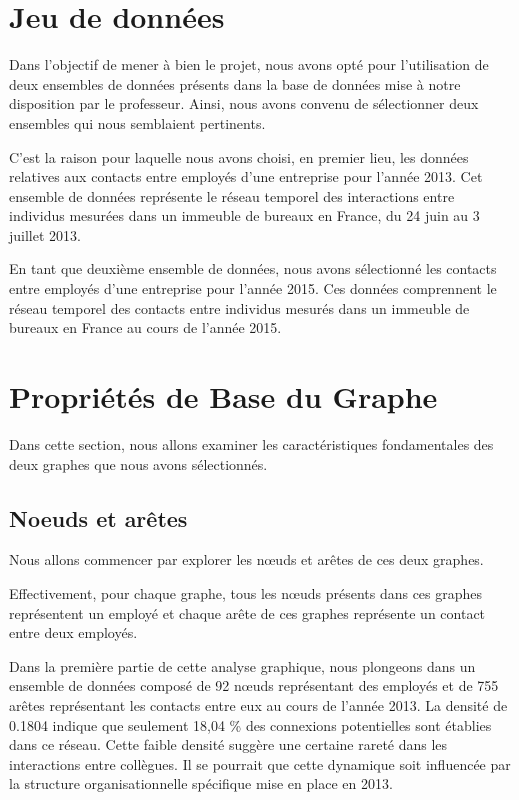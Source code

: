 \documentclass{article}
\begin{document}
\section{Jeu de données}
Dans l'objectif de mener à bien le projet, nous avons opté pour l'utilisation de deux ensembles de données présents dans la base de données mise à notre disposition par le professeur. Ainsi, nous avons convenu de sélectionner deux ensembles qui nous semblaient pertinents.

C'est la raison pour laquelle nous avons choisi, en premier lieu, les données relatives aux contacts entre employés d'une entreprise pour l'année 2013. Cet ensemble de données représente le réseau temporel des interactions entre individus mesurées dans un immeuble de bureaux en France, du 24 juin au 3 juillet 2013.

En tant que deuxième ensemble de données, nous avons sélectionné les contacts entre employés d'une entreprise pour l'année 2015. Ces données comprennent le réseau temporel des contacts entre individus mesurés dans un immeuble de bureaux en France au cours de l'année 2015.

\section{Propriétés de Base du Graphe}

Dans cette section, nous allons examiner les caractéristiques fondamentales des deux graphes que nous avons sélectionnés.


\subsection{Noeuds et arêtes}
Nous allons commencer par explorer les nœuds et arêtes de ces deux graphes.

Effectivement, pour chaque graphe, tous les nœuds présents dans ces graphes représentent un employé et chaque arête de ces graphes représente un contact entre deux employés.


Dans la première partie de cette analyse graphique, nous plongeons dans un ensemble de données composé de 92 nœuds représentant des employés et de 755 arêtes représentant les contacts entre eux au cours de l'année 2013. La densité de 0.1804 indique que seulement 18,04 \% des connexions potentielles sont établies dans ce réseau. Cette faible densité suggère une certaine rareté dans les interactions entre collègues. Il se pourrait que cette dynamique soit influencée par la structure organisationnelle spécifique mise en place en 2013.
\end{document}
